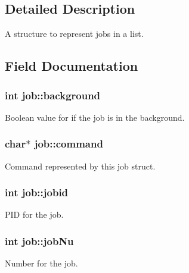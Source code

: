 \subsection{Detailed Description}
A structure to represent jobs in a list. 

\subsection{Field Documentation}
\hypertarget{structjob_a1bc2e887b4110bd0a380cb06ab2f7cbf}{
\subsubsection[{background}]{\setlength{\rightskip}{0pt plus 5cm}int {\bf job::background}}}
\label{structjob_a1bc2e887b4110bd0a380cb06ab2f7cbf}


Boolean value for if the job is in the background. 

\hypertarget{structjob_aeac80b69b63321f8d60bee5b13d69858}{
\subsubsection[{command}]{\setlength{\rightskip}{0pt plus 5cm}char$\ast$ {\bf job::command}}}
\label{structjob_aeac80b69b63321f8d60bee5b13d69858}


Command represented by this job struct. 

\hypertarget{structjob_afe3a32adf804677267c68bb127a00cca}{
\subsubsection[{jobid}]{\setlength{\rightskip}{0pt plus 5cm}int {\bf job::jobid}}}
\label{structjob_afe3a32adf804677267c68bb127a00cca}


PID for the job. 

\hypertarget{structjob_a18569aada40953b60f0bd33c5792b249}{
\subsubsection[{jobNu}]{\setlength{\rightskip}{0pt plus 5cm}int {\bf job::jobNu}}}
\label{structjob_a18569aada40953b60f0bd33c5792b249}


Number for the job. 

